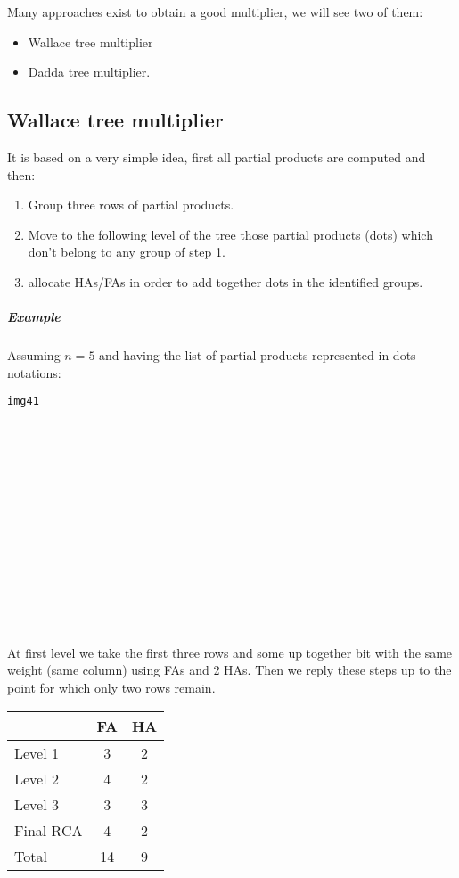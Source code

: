 Many approaches exist to obtain a good multiplier, we will see two of them:
\begin{itemize}
  \item Wallace tree multiplier
  \item Dadda tree multiplier.
\end{itemize}

\subsection{Wallace tree multiplier}
It is based on a very simple idea, first all partial products are computed and then:
\begin{enumerate}
  \item Group three rows of partial products.
  \item Move to the following level of the tree those partial products (dots) which don't belong to any group of step 1.
  \item allocate HAs/FAs in order to add together dots in the identified groups.
\end{enumerate}

\subparagraph{Example}
Assuming $n=5$ and having the list of partial products represented in dots notations:
\begin{verbatim}
img41
















\end{verbatim}

At first level we take the first three rows and some up together bit with the same weight (same column) using FAs and 2 HAs. Then we reply these steps up to the point for which only two rows remain.

\begin{center}
  \begin{tabular}{|l|c|c|}
    \hline
     & FA & HA\\
     \hline
     Level 1&   3&    2\\
     Level 2&   4&    2\\
     Level 3&   3&    3\\
     Final RCA&   4&    2\\
     \hline
     Total&     14&   9\\
     \hline
  \end{tabular}
\end{center}


